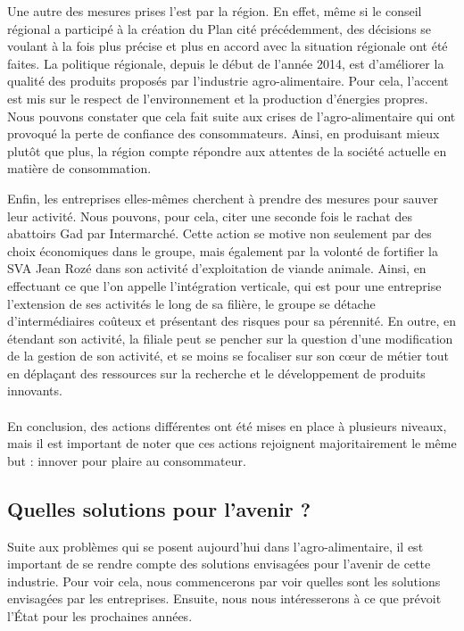 \documentclass[a4paper,10pt]{report}
\begin{document}
			Une autre des mesures prises l’est par la région. En effet, même si le conseil régional a participé à la création du Plan cité précédemment, des décisions se voulant à la fois plus précise et plus en accord avec la situation régionale ont été faites. La politique régionale, depuis le début de l’année 2014, est d’améliorer la qualité des produits proposés par l’industrie agro-alimentaire\cite{FavoriserQualiteAgricultureAgroalimentaire}. Pour cela, l’accent est mis sur le respect de l’environnement et la production d’énergies propres. Nous pouvons constater que cela fait suite aux crises de l’agro-alimentaire qui ont provoqué la perte de confiance des consommateurs. Ainsi, en produisant mieux plutôt que plus, la région compte répondre aux attentes de la société actuelle en matière de consommation.

			Enfin, les entreprises elles-mêmes cherchent à prendre des mesures pour sauver leur activité. Nous pouvons, pour cela, citer une seconde fois le rachat des abattoirs Gad par Intermarché. Cette action se motive non seulement par des choix économiques dans le groupe, mais également par la volonté de fortifier la SVA Jean Rozé dans son activité d’exploitation de viande animale. Ainsi, en effectuant ce que l’on appelle l’intégration verticale, qui est pour une entreprise l’extension de ses activités le long de sa filière, le groupe se détache d’intermédiaires coûteux et présentant des risques pour sa pérennité. En outre, en étendant son activité, la filiale peut se pencher sur la question d’une modification de la gestion de son activité, et se moins se focaliser sur son cœur de métier tout en déplaçant des ressources sur la recherche et le développement de produits innovants.

			\paragraph{}En conclusion, des actions différentes ont été mises en place à plusieurs niveaux, mais il est important de noter que ces actions rejoignent majoritairement le même but : innover pour plaire au consommateur.

			
		\subsection{Quelles solutions pour l'avenir ?}
			Suite aux problèmes qui se posent aujourd'hui dans l’agro-alimentaire, il est important de se rendre compte des solutions envisagées pour l’avenir de cette industrie. Pour voir cela, nous commencerons par voir quelles sont les solutions envisagées par les entreprises. Ensuite, nous nous intéresserons à ce que prévoit l’État pour les prochaines années.
			
\end{document}
